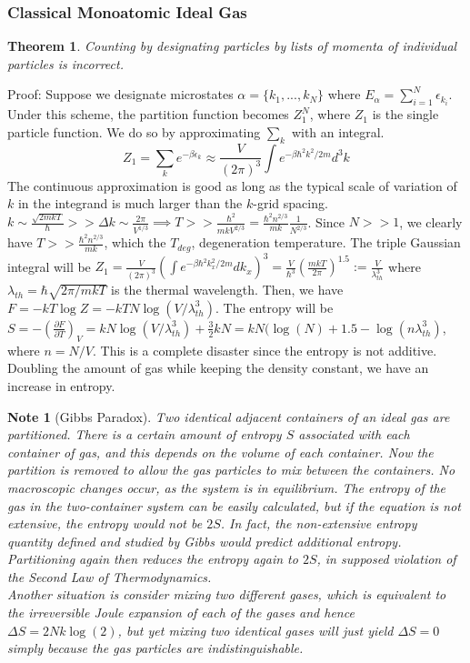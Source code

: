 \documentclass[a4paper]{article}
\newtheorem{Note}{Note}[section]
\theoremstyle{new}
\newtheorem{thm}{Theorem}[section]
\begin{document}
\subsubsection*{Classical Monoatomic Ideal Gas}
\begin{thm}
Counting by designating particles by lists of momenta of individual particles is incorrect.
\end{thm}
Proof: Suppose we designate microstates $\alpha=\{k_1,...,k_N\}$ where $E_\alpha=\sum_{i=1}^N\epsilon_{k_i}$. Under this scheme, the partition function becomes $Z_1^N$, where $Z_1$ is the single particle function. We do so by approximating $\sum_k$ with an integral.
$$Z_1=\sum_ke^{-\beta\epsilon_k}\approx\frac{V}{(2\pi)^3}\int e^{-\beta\hbar^2k^2/2m}d^3k$$
The continuous approximation is good as long as the typical scale of variation of $k$ in the integrand is much larger than the $k$-grid spacing. $k\sim\frac{\sqrt{2mkT}}{\hbar}>>\Delta k\sim\frac{2\pi}{V^{1/3}}\implies T>>\frac{\hbar^2}{mkV^{2/3}}=\frac{\hbar^2n^{2/3}}{mk}\frac{1}{N^{2/3}}$. Since $N>>1$, we clearly have $T>>\frac{\hbar^2n^{2/3}}{mk}$, which the $T_{deg}$, degeneration temperature. The triple Gaussian integral will be $Z_1=\frac{V}{(2\pi)^3}(\int e^{-\beta\hbar^2k_x^2/2m}dk_x)^3=\frac{V}{\hbar^3}(\frac{mkT}{2\pi})^{1.5}:=\frac{V}{\lambda_{th}^3}$ where $\lambda_{th}=\hbar\sqrt{2\pi/mkT}$ is the thermal wavelength. Then, we have $F=-kT\log Z=-kTN\log(V/\lambda^3_{th})$. The entropy will be $S=-(\frac{\partial F}{\partial T})_V=kN\log(V/\lambda_{th}^3)+\frac{3}{2}kN=kN(\log(N)+1.5-\log(n\lambda_{th}^3)$, where $n=N/V$. This is a complete disaster since the entropy is not additive. Doubling the amount of gas while keeping the density constant, we have an increase in entropy.
\begin{Note}[Gibbs Paradox]
Two identical adjacent containers of an ideal gas are partitioned. There is a certain amount of entropy $S$ associated with each container of gas, and this depends on the volume of each container. Now the partition is removed to allow the gas particles to mix between the containers. No macroscopic changes occur, as the system is in equilibrium. The entropy of the gas in the two-container system can be easily calculated, but if the equation is not extensive, the entropy would not be $2S$. In fact, the non-extensive entropy quantity defined and studied by Gibbs would predict additional entropy. Partitioning again then reduces the entropy again to $2S$, in supposed violation of the Second Law of Thermodynamics.\\[5pt]
Another situation is consider mixing two different gases, which is equivalent to the irreversible Joule expansion of each of the gases and hence $\Delta S=2Nk\log(2)$, but yet mixing two identical gases will just yield $\Delta S=0$ simply because the gas particles are indistinguishable.
\end{Note}
\end{document}
